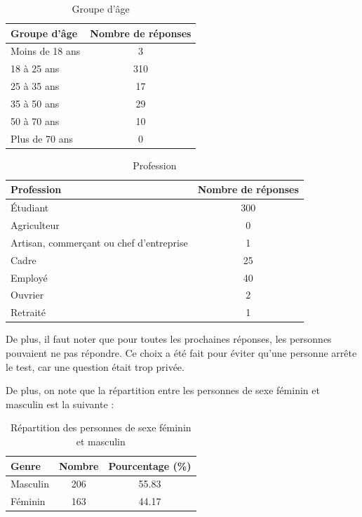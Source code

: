 \documentclass[12pt,a4paper]{report}
\begin{document}
\begin{table}[H]
    \centering
    \begin{tabular}{|l|c|}
    \hline
    \textbf{Groupe d'âge} & \textbf{Nombre de réponses} \\
    \hline
    Moins de 18 ans & 3 \\
    18 à 25 ans & 310 \\
    25 à 35 ans & 17 \\
    35 à 50 ans & 29 \\
    50 à 70 ans & 10 \\
    Plus de 70 ans & 0 \\
    \hline
    \end{tabular}
    \caption{Groupe d'âge}
\end{table}
    
\begin{table}[H]
    \centering
    \begin{tabular}{|l|c|}
    \hline
    \textbf{Profession} & \textbf{Nombre de réponses} \\
    \hline
    Étudiant & 300 \\
    Agriculteur & 0 \\
    Artisan, commerçant ou chef d'entreprise & 1 \\
    Cadre & 25 \\
    Employé & 40 \\
    Ouvrier & 2 \\
    Retraité & 1 \\
    \hline
    \end{tabular}
    \caption{Profession}
    \label{tab:Profession}
\end{table}

De plus, il faut noter que pour toutes les prochaines réponses, les personnes pouvaient ne pas répondre.
Ce choix a été fait pour éviter qu'une personne arrête le test, car une question était trop privée.

De plus, on note que la répartition entre les personnes de sexe féminin et masculin est la suivante :

\begin{table}[H]
    \centering
    \begin{tabular}{|l|c|c|}
    \hline
    \textbf{Genre} & \textbf{Nombre} & \textbf{Pourcentage (\%)} \\
    \hline
    Masculin & 206 & 55.83 \\
    Féminin & 163 & 44.17 \\
    \hline
\end{tabular}
\caption{Répartition des personnes de sexe féminin et masculin}
\end{table}
\end{document}
